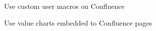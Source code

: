 \documentclass{article}
\begin{document}
\begin{appendices}
\begin{figure}[H]
    \centering
    \captionsetup{labelformat=empty}
    \caption{Use custom user macros on Confluence}
    \noindent{}
\end{figure}

\begin{figure}[H]
    \centering
    \captionsetup{labelformat=empty}
    \caption{Use value charts embedded to Confluence pages}
    \noindent{}
\end{figure}

\end{appendices}
\end{document}
